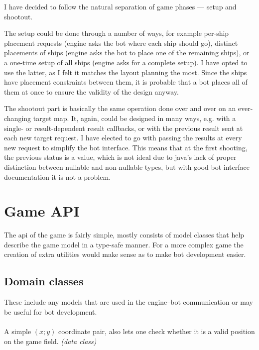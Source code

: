 		I have decided to follow the natural separation of game phases --- setup and shootout.
		
		The setup could be done through a number of ways, for example per-ship placement requests (engine asks the bot where each ship should go), distinct placements of ships (engine asks the bot to place one of the remaining ships), or a one-time setup of all ships (engine asks for a complete setup). I have opted to use the latter, as I felt it matches the layout planning the most. Since the ships have placement constraints between them, it is probable that a bot places all of them at once to ensure the validity of the design anyway.
		
		The shootout part is basically the same operation done over and over on an ever-changing target map. It, again, could be designed in many ways, e.g. with a single- or result-dependent result callbacks, or with the previous result sent at each new target request. I have elected to go with passing the results at every new request to simplify the bot interface. This means that at the first shooting, the previous status is a  value, which is not ideal due to java's lack of proper distinction between nullable and non-nullable types, but with good bot interface documentation it is not a problem.

		\section{Game API}
		
		The api of the game is fairly simple, mostly consists of model classes that help describe the game model in a type-safe manner. For a more complex game the creation of extra utilities would make sense as to make bot development easier. 
		
			\subsection{Domain classes}
			
			These include any models that are used in the engine--bot communication or may be useful for bot development.
			
				\paragraph{} A simple $(x; y)$ coordinate pair, also lets one check whether it is a valid position on the game field. \emph{(data class)}
				
